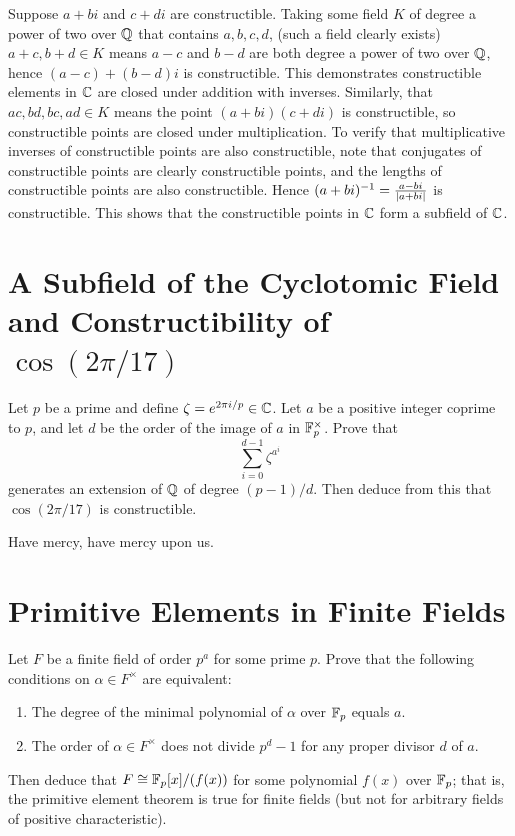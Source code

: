 \documentclass[12pt]{article}
\begin{document}
Suppose $a + bi$ and $c + di$ are constructible. 
Taking some field $K$ of degree a power of two over $\mathbb{Q}$ that contains $a, b, c, d$, (such a field clearly exists)  
$a + c, b + d \in K$ means $a - c$ and $b - d$ are both degree a power of two over $\mathbb{Q}$, hence $(a - c) + (b - d)i$ is constructible. 
This demonstrates constructible elements in $\mathbb{C}$ are closed under addition with inverses. 
Similarly, that $ac, bd, bc, ad \in K$ means the point $(a + bi)(c + di)$ is constructible, so constructible points are closed under multiplication.  
To verify that multiplicative inverses of constructible points are also constructible, note that 
conjugates of constructible points are clearly constructible points, and the lengths of constructible points are also constructible.
Hence $(a + bi)^{-1} = \frac{a - bi}{\left|a + bi\right|}$ is constructible. 
This shows that the constructible points in $\mathbb{C}$ form a subfield of $\mathbb{C}$. 

 
\section{A Subfield of the Cyclotomic Field and Constructibility of \texorpdfstring{$\cos(2\pi/17)$}{cos(2/17)}}
 
Let $p$ be a prime and define $\zeta = e^{2\pi i/p} \in \mathbb{C}$. Let $a$ be a positive integer coprime to $p$, and let $d$ be the order of the image of $a$ in $\mathbb{F}_p^\times$. Prove that
\[
  \sum_{i=0}^{d-1} \zeta^{a^i}
\]
generates an extension of $\mathbb{Q}$ of degree $(p-1)/d$. Then deduce from this that $\cos(2\pi/17)$ is constructible.

\noindent\dotfill 

Have mercy, have mercy upon us. 
 
\section{Primitive Elements in Finite Fields}
 
Let $F$ be a finite field of order $p^a$ for some prime $p$. Prove that the following conditions on $\alpha \in F^\times$ are equivalent:
\begin{enumerate}[label=(\roman*)]
  \item The degree of the minimal polynomial of $\alpha$ over $\mathbb{F}_p$ equals $a$.
  \item The order of $\alpha \in F^\times$ does not divide $p^d - 1$ for any proper divisor $d$ of $a$.
\end{enumerate}
Then deduce that $F \cong \F_p[x]/(f(x))$ for some polynomial $f(x)$ over $\mathbb{F}_p$; that is, the primitive element theorem is true for finite fields (but not for arbitrary fields of positive characteristic).
\end{document}
